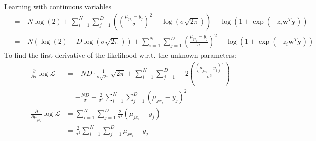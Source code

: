 \documentclass{ml}
\begin{document}
\begin{question}{Learning with continuous variables}
\begin{align*}
            &= -N\log(2) + \sum\limits_{i=1}^N \sum \limits_{j=1}^D
                \left( \left( \frac{\mu_{j{x_i}}-y_j}{\sigma}\right)^2 -
                \log (\sigma\sqrt{2\pi})\right) - 
                \log(1+\exp(-z_i\textbf{w}^T\textbf{y})) \\
            &= -N(\log(2) + D\log(\sigma\sqrt{2\pi})) +
                \sum\limits_{i=1}^N \sum\limits_{j=1}^D \left(
                \frac{\mu_{jx_i}-y_j}{\sigma} \right)^2 - \log
                (1+\exp(-z_i\textbf{w}^T\textbf{y}))
        \end{align*}
        To find the first derivative of the likelihood w.r.t. the
        unknown parameters:
        \begin{align*}
            \frac{\partial}{\partial\sigma}\log \mathcal{L}
            &= -ND\cdot \frac{1}{\sigma\sqrt{2\pi}} \sqrt{2\pi} +
                \sum\limits_{i=1}^N \sum\limits_{j=1}^D -2 \left(
                \frac{(\mu_{jx_i}-y_j)^2}{\sigma^3} \right) \\
            &= -\frac{ND}{\sigma} + \frac{2}{\sigma^3} 
                \sum\limits_{i=1}^N \sum\limits_{j=1}^D
                (\mu_{jx_i}-y_j)^2 \\
            \frac{\partial}{\partial\mu_{jx_i}} \log \mathcal{L}
            &= \sum\limits_{i=1}^N \sum\limits_{j=1}^D
                \frac{2}{\sigma^2} (\mu_{jx_i}-y_j) \\
            &= \frac{2}{\sigma^2} \sum\limits_{i=1}^N
                \sum\limits_{j=1}^D \mu_{jx_i}-y_j
        \end{align*}
\end{question} %

\end{document}
